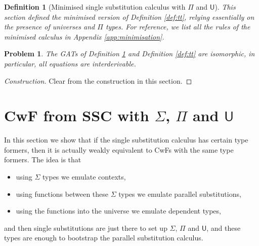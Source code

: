 \documentclass[a4paper,UKenglish]{article}
\newtheorem{problem}[theorem]{Problem}
\newtheorem{definition}[theorem]{Definition}
\newcommand{\U}{\mathsf{U}}
\begin{document}
\begin{definition}[Minimised single substitution calculus with $\Pi$ and $\U$]\label{def:min}
  This section defined the minimised version of Definition
  \ref{def:tt}, relying essentially on the presence of universes and
  $\Pi$ types. For reference, we list all the rules of the minimised
  calculus in Appendix \ref{app:minimisation}.
\end{definition}
\begin{problem}
  The GATs of Definition \ref{def:min} and Definition \ref{def:tt} are
  isomorphic, in particular, all equations are interderivable.
\end{problem}
\begin{proof}[Construction]
  Clear from the construction in this section.
\end{proof}

\section{\texorpdfstring{CwF from SSC with $\Sigma$, $\Pi$ and $\U$}{CwF from SSC with Σ, Π and U}}
\label{sec:cwf}

In this section we show that if the single substitution calculus has
certain type formers, then it is actually weakly equivalent to CwFs
with the same type formers. The idea is that
\begin{itemize}
\item using $\Sigma$ types we emulate contexts,
\item using functions between these $\Sigma$ types we emulate parallel
  substitutions,
\item using the functions into the universe we emulate dependent types,
\end{itemize}
and then single substitutions are just there to set up $\Sigma$, $\Pi$
and $\U$, and these types are enough to bootstrap the parallel
substitution calculus.
\end{document}
